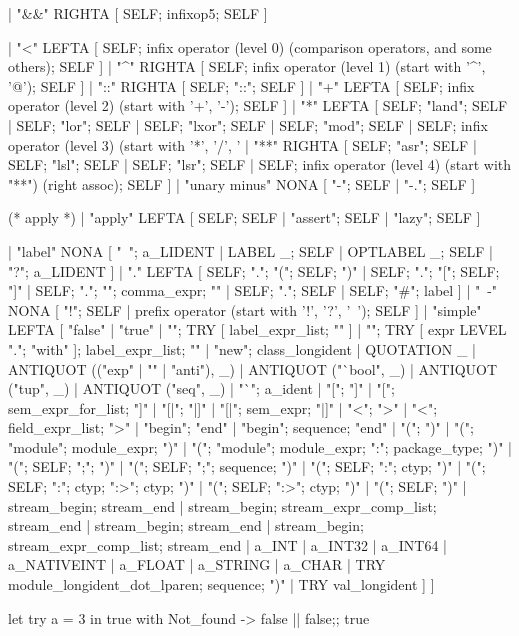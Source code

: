 \begin{enumerate}
\begin{enumerate}[(a)]
\begin{itemize}
\begin{bluetext}
| "&&" RIGHTA
  [ SELF; infixop5; SELF ]

| "<" LEFTA
  [ SELF; infix operator (level 0) (comparison operators, and some others);
    SELF ]
| "^" RIGHTA
  [ SELF; infix operator (level 1) (start with '^', '@'); SELF ]
| "::" RIGHTA
  [ SELF; "::"; SELF ]
| "+" LEFTA
  [ SELF; infix operator (level 2) (start with '+', '-'); SELF ]
| "*" LEFTA
  [ SELF; "land"; SELF
  | SELF; "lor"; SELF
  | SELF; "lxor"; SELF
  | SELF; "mod"; SELF
  | SELF; infix operator (level 3) (start with '*', '/', '%
| "**" RIGHTA
  [ SELF; "asr"; SELF
  | SELF; "lsl"; SELF
  | SELF; "lsr"; SELF
  | SELF; infix operator (level 4) (start with "**") (right assoc); SELF ]
| "unary minus" NONA
  [ "-"; SELF
  | "-."; SELF ]

(* apply *)
| "apply" LEFTA
  [ SELF; SELF
  | "assert"; SELF
  | "lazy"; SELF ]
  
| "label" NONA
  [ "~"; a_LIDENT
  | LABEL _; SELF
  | OPTLABEL _; SELF
  | "?"; a_LIDENT ]
| "." LEFTA
  [ SELF; "."; "("; SELF; ")"
  | SELF; "."; "["; SELF; "]"
  | SELF; "."; "{"; comma_expr; "}"
  | SELF; "."; SELF
  | SELF; "#"; label ]
| "~-" NONA
  [ "!"; SELF
  | prefix operator (start with '!', '?', '~'); SELF ]
| "simple" LEFTA
  [ "false"
  | "true"
  | "{"; TRY [ label_expr_list; "}" ]
  | "{"; TRY [ expr LEVEL "."; "with" ]; label_expr_list; "}"
  | "new"; class_longident
  | QUOTATION _
  | ANTIQUOT (("exp" | "" | "anti"), _)
  | ANTIQUOT ("`bool", _)
  | ANTIQUOT ("tup", _)
  | ANTIQUOT ("seq", _)
  | "`"; a_ident
  | "["; "]"
  | "["; sem_expr_for_list; "]"
  | "[|"; "|]"
  | "[|"; sem_expr; "|]"
  | "{<"; ">}"
  | "{<"; field_expr_list; ">}"
  | "begin"; "end"
  | "begin"; sequence; "end"
  | "("; ")"
  | "("; "module"; module_expr; ")"
  | "("; "module"; module_expr; ":"; package_type; ")"
  | "("; SELF; ";"; ")"
  | "("; SELF; ";"; sequence; ")"
  | "("; SELF; ":"; ctyp; ")"
  | "("; SELF; ":"; ctyp; ":>"; ctyp; ")"
  | "("; SELF; ":>"; ctyp; ")"
  | "("; SELF; ")"
  | stream_begin; stream_end
  | stream_begin; stream_expr_comp_list; stream_end
  | stream_begin; stream_end
  | stream_begin; stream_expr_comp_list; stream_end
  | a_INT
  | a_INT32
  | a_INT64
  | a_NATIVEINT
  | a_FLOAT
  | a_STRING
  | a_CHAR
  | TRY module_longident_dot_lparen; sequence; ")"
  | TRY val_longident ] ]  
\end{bluetext}

\begin{alternate}
let try a = 3 in true with Not_found -> false || false;;
true  
\end{alternate}


\end{itemize}
\end{enumerate}
\end{enumerate}
